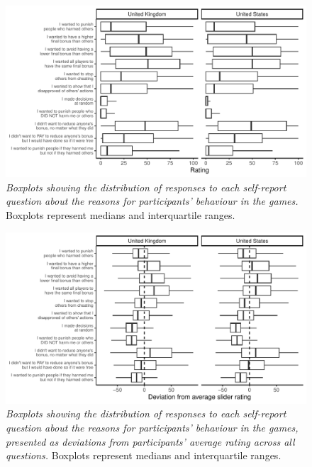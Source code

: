 \documentclass[
  english,
  man, donotrepeattitle,floatsintext]{apa6}
\begin{document}
\newpage





\begin{figure}
\centering
\includegraphics{manuscript_files/figure-latex/plotSliders1-1.pdf}
\caption{\label{fig:plotSliders1}\emph{Boxplots showing the distribution of responses to each
self-report question about the reasons for participants' behaviour in the games.}
Boxplots represent medians and interquartile ranges.}
\end{figure}

\newpage






\begin{figure}
\centering
\includegraphics{manuscript_files/figure-latex/plotSliders2-1.pdf}
\caption{\label{fig:plotSliders2}\emph{Boxplots showing the distribution of responses to each
self-report question about the reasons for participants' behaviour in the games,
presented as deviations from participants' average rating across all questions.}
Boxplots represent medians and interquartile ranges.}
\end{figure}
\end{document}
